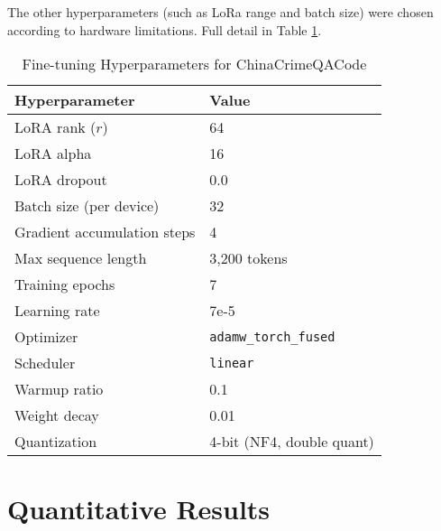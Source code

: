 The other hyperparameters (such as LoRa range and batch size) were chosen according to hardware limitations. Full detail in Table \ref{tab:hyperparameters}.

\begin{table}[H]
\centering
\caption{Fine-tuning Hyperparameters for ChinaCrimeQACode}
\label{tab:hyperparameters}
\begin{tabular}{ll}
\toprule
\textbf{Hyperparameter} & \textbf{Value} \\
\midrule
LoRA rank ($r$) & 64 \\
LoRA alpha & 16 \\
LoRA dropout & 0.0 \\
Batch size (per device) & 32 \\
Gradient accumulation steps & 4 \\
Max sequence length & 3,200 tokens \\
Training epochs & 7 \\
Learning rate & 7e-5 \\
Optimizer & \texttt{adamw\_torch\_fused} \\
Scheduler & \texttt{linear} \\
Warmup ratio & 0.1 \\
Weight decay & 0.01 \\
Quantization & 4-bit (NF4, double quant) \\
\bottomrule
\end{tabular}
\end{table}

\section{Quantitative Results}

